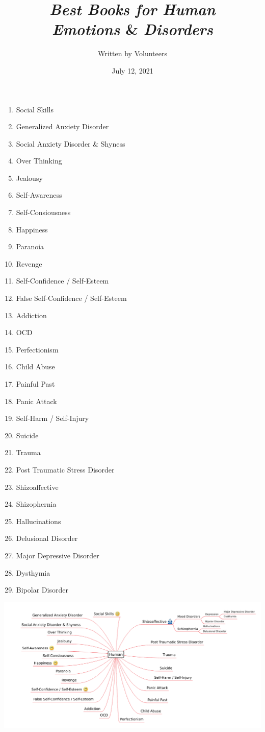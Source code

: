 \documentclass[12pt, a4paper]{article}
\title{\emph{Best Books for Human\\Emotions} \& \emph{Disorders}}
\author{Written by Volunteers}
\date{July 12, 2021}
\begin{document}
\maketitle
\begin{enumerate}

\item Social Skills
\item Generalized Anxiety Disorder
\item Social Anxiety Disorder \& Shyness
\item Over Thinking
\item Jealousy
\item Self-Awareness
\item Self-Consiousness
\item Happiness
\item Paranoia
\item Revenge
\item Self-Confidence / Self-Esteem
\item False Self-Confidence / Self-Esteem
\item Addiction
\item OCD
\item Perfectionism
\item Child Abuse \item Painful Past
\item Panic Attack
\item Self-Harm / Self-Injury
\item Suicide
\item Trauma
\item Post Traumatic Stress Disorder
\item Shizoaffective
\item Shizophernia
\item Hallucinations
\item Delusional Disorder
\item Major Depressive Disorder
\item Dysthymia
\item Bipolar Disorder

\end{enumerate}

\begin{center}
	\includegraphics[scale=0.43]{human.png}
\end{center}
\end{document}
